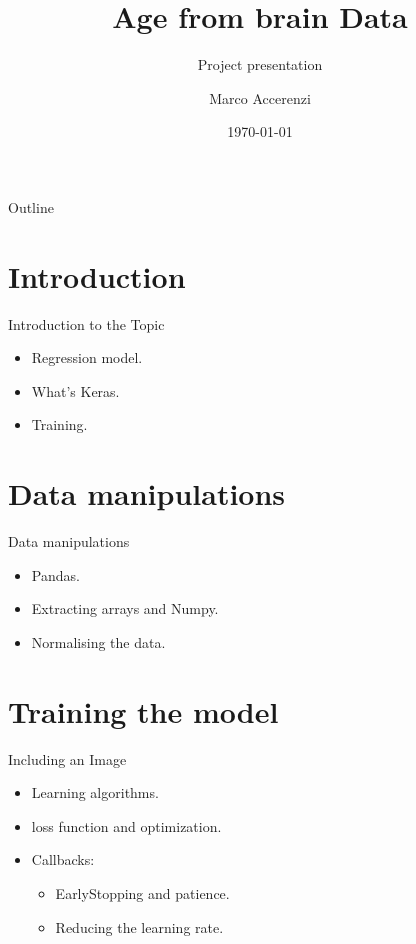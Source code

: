 \documentclass{beamer}
\title{Age from brain Data}
\subtitle{Project presentation}
\author{Marco Accerenzi}
\institute{Università di Pisa - Dipartimento di Fisica}
\date{\today}
\begin{document}
\begin{frame}
    \titlepage
\end{frame}

\begin{frame}{Outline}
    \tableofcontents
\end{frame}

\section{Introduction}
\begin{frame}{Introduction to the Topic}
    \begin{itemize}
        \item Regression model.
        \item What's Keras.
        \item Training.
    \end{itemize}
\end{frame}

\section{Data manipulations}
\begin{frame}{Data manipulations}
    \begin{itemize}
        \item Pandas.
        \item Extracting arrays and Numpy.
        \item Normalising the data.
    \end{itemize}
\end{frame}

\section{Training the model}
\begin{frame}{Including an Image}
	\begin{itemize}
		\item Learning algorithms.
		\item loss function and optimization.
		\item Callbacks:
		\begin{itemize}
			\item EarlyStopping and patience.
			\item Reducing the learning rate.
		\end{itemize}
    \end{itemize}
\end{frame}
\end{document}
